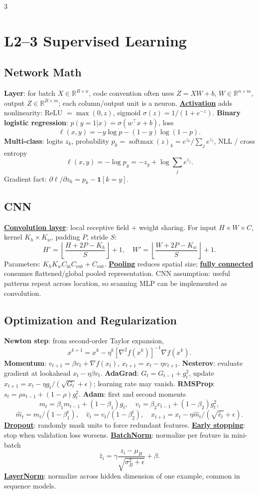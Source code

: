 \documentclass{article}
\newcommand{\key}[1]{\textbf{#1}}
\newcommand{\lowterm}[1]{\textbf{\underline{#1}}}
\newcommand{\R}{\mathbb{R}}
\DeclareMathOperator{\softmax}{softmax}
\begin{document}
\tiny
\begin{multicols*}{3}

\section{L2--3 Supervised Learning}
\subsection{Network Math}
\key{Layer}: for batch $X\in\R^{B\times n}$, code convention often uses $Z=XW+b$, $W\in\R^{n\times m}$, output $Z\in\R^{B\times m}$; each column/output unit is a neuron. \lowterm{Activation} adds nonlinearity: ReLU $=\max(0,z)$, sigmoid $\sigma(z)=1/(1+e^{-z})$.
\key{Binary logistic regression}: $p(y=1|x)=\sigma(w^\top x+b)$, loss
\[
\ell(x,y)=-y\log p-(1-y)\log(1-p).
\]
\key{Multi-class}: logits $z_k$, probability $p_k=\softmax(z)_k=e^{z_k}/\sum_j e^{z_j}$, NLL / cross entropy
\[
\ell(x,y)=-\log p_y=-z_y+\log\sum_j e^{z_j}.
\]
Gradient fact: $\partial\ell/\partial z_k=p_k-\mathbf 1[k=y]$.

\subsection{CNN}
\lowterm{Convolution layer}: local receptive field + weight sharing. For input $H\times W\times C$, kernel $K_h\times K_w$, padding $P$, stride $S$:
\[
H'=\left\lfloor\frac{H+2P-K_h}{S}\right\rfloor+1,\quad
W'=\left\lfloor\frac{W+2P-K_w}{S}\right\rfloor+1.
\]
Parameters: $K_hK_wC_{\text{in}}C_{\text{out}}+C_{\text{out}}$. \lowterm{Pooling} reduces spatial size; \lowterm{fully connected} consumes flattened/global pooled representation. CNN assumption: useful patterns repeat across location, so scanning MLP can be implemented as convolution.

\subsection{Optimization and Regularization}
\key{Newton step}: from second-order Taylor expansion,
\[
x^{k+1}=x^k-\eta^k[\nabla^2 f(x^k)]^{-1}\nabla f(x^k).
\]
\key{Momentum}: $v_{t+1}=\beta v_t+\nabla f(x_t)$, $x_{t+1}=x_t-\eta v_{t+1}$. \key{Nesterov}: evaluate gradient at lookahead $x_t-\eta\beta v_t$. \key{AdaGrad}: $G_t=G_{t-1}+g_t^2$, update $x_{t+1}=x_t-\eta g_t/(\sqrt{G_t}+\epsilon)$; learning rate may vanish. \key{RMSProp}: $s_t=\rho s_{t-1}+(1-\rho)g_t^2$. \key{Adam}: first and second moments
\[
m_t=\beta_1m_{t-1}+(1-\beta_1)g_t,\quad
v_t=\beta_2v_{t-1}+(1-\beta_2)g_t^2,
\]
\[
\hat m_t=m_t/(1-\beta_1^t),\quad \hat v_t=v_t/(1-\beta_2^t),\quad
x_{t+1}=x_t-\eta\hat m_t/(\sqrt{\hat v_t}+\epsilon).
\]
\lowterm{Dropout}: randomly mask units to force redundant features. \lowterm{Early stopping}: stop when validation loss worsens. \lowterm{BatchNorm}: normalize per feature in mini-batch
\[
\hat z_i=\gamma\frac{z_i-\mu_B}{\sqrt{\sigma_B^2+\epsilon}}+\beta.
\]
\lowterm{LayerNorm}: normalize across hidden dimension of one example, common in sequence models.


\end{multicols*}
\end{document}
